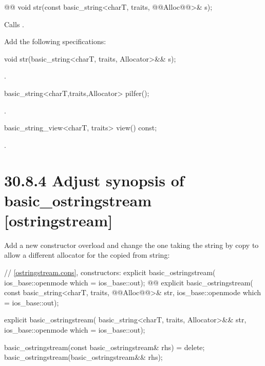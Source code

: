\documentclass[ebook,11pt,article]{memoir}
\begin{document}
\begin{itemdecl}
    @@
    void str(const basic_string<charT, traits, @@Alloc@@>& s);
\end{itemdecl}

\begin{itemdescr}
\pnum
\effects
Calls
.
\end{itemdescr}


Add the following specifications:

\begin{addedblock}
\begin{itemdecl}
void str(basic_string<charT, traits, Allocator>&& s);
\end{itemdecl}
\begin{itemdescr}
\pnum
\effects {}.
\end{itemdescr}
\begin{itemdecl}
basic_string<charT,traits,Allocator> pilfer();
\end{itemdecl}
\begin{itemdescr}
\pnum
\returns {}.
\end{itemdescr}
\begin{itemdecl}
basic_string_view<charT, traits> view() const;
\end{itemdecl}
\begin{itemdescr}
\pnum
\returns {}.
\end{itemdescr}
\end{addedblock}


\section{30.8.4 Adjust synopsis of basic\_ostringstream [ostringstream]}
Add a new constructor overload and change the one taking the string by copy to allow a different allocator for the copied from string:
\begin{codeblock}
    // \ref{ostringstream.cons}, constructors:
    explicit basic_ostringstream(
      ios_base::openmode which = ios_base::out);
    @@
    explicit basic_ostringstream(
      const basic_string<charT, traits, @@Alloc@@>& str,
      ios_base::openmode which = ios_base::out);
\end{codeblock}
\begin{addedblock}
\begin{codeblock}
    explicit basic_ostringstream(
      basic_string<charT, traits, Allocator>&& str,
      ios_base::openmode which = ios_base::out);
\end{codeblock}
\end{addedblock}
\begin{codeblock}
    basic_ostringstream(const basic_ostringstream& rhs) = delete;
    basic_ostringstream(basic_ostringstream&& rhs);
\end{codeblock}
\end{document}

